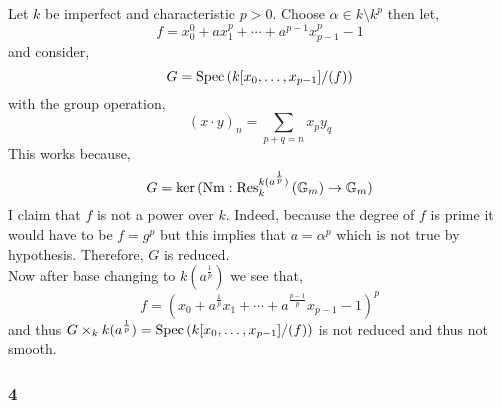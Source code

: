 \documentclass[12pt]{article}
\begin{document}
Let $k$ be imperfect and characteristic $p > 0$. Choose $\alpha \in k \setminus k^p$ then let,
\[ f = x_0^0 + a x_1^p + \cdots + a^{p-1} x_{p-1}^p - 1 \]
and consider,
\[ G = \mathrm{Spec}\left( k[x_0, \dots, x_{p-1}]/(f) \right) \]
with the group operation,
\[ (x \cdot y)_n = \sum_{p + q = n} x_p y_q \]
This works because,
\[ G = \ker{(\mathrm{Nm} : \mathrm{Res}^{k(a^{\frac{1}{p}})}_{k} \left( {\mathbb{G}_m}\right) \to {\mathbb{G}_m})} \]
I claim that $f$ is not a power over $k$. Indeed, because the degree of $f$ is prime it would have to be $f = g^p$ but this implies that $a = \alpha^p$ which is not true by hypothesis. Therefore, $G$ is reduced.
\bigskip\\
Now after base changing to $k(a^{\frac{1}{p}})$ we see that,
\[ f = (x_0 + a^{\frac{1}{p}} x_1 + \cdots + a^{\frac{p-1}{p}} x_{p-1} - 1)^p \]
and thus $G \times_k k(a^{\frac{1}{p}}) = \mathrm{Spec}\left( k[x_0, \dots, x_{p-1}]/(f) \right)$ is not reduced and thus not smooth. 


\subsubsection{4}
\end{document}
